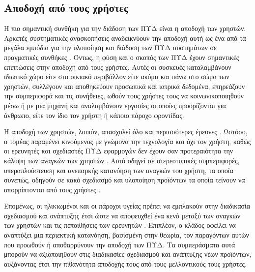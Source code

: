 \subsection{Αποδοχή από τους χρήστες}
Η πιο σημαντική συνθήκη για την διάδοση των ΠΥΔ είναι η αποδοχή των χρηστών.
Αρκετές συστηματικές ανασκοπήσεις αναδεικνύουν την αποδοχή αυτή ως ένα από τα μεγάλα εμπόδια για την υλοποίηση και διάδοση των ΠΥΔ συστημάτων σε πραγματικές συνθήκες \cite{Peek2014}\cite{rashidi2012survey}\cite{Robinson2014}.
Όντως, η φύση και ο σκοπός των ΠΥΔ έχουν σημαντικές επιπτώσεις στην αποδοχή από τους χρήστες.
Αυτές οι συσκευές καταλαμβάνουν ιδιωτικό χώρο είτε στο οικιακό περιβάλλον είτε ακόμα και πάνω στο σώμα των χρηστών, συλλέγουν και αποθηκεύουν προσωπικά και ιατρικά δεδομένα, επηρεάζουν την συμπεριφορά και τις συνήθειες, ωθούν τους χρήστες τους να κοινωνικοποιηθούν μέσω ή με μια μηχανή και αναλαμβάνουν εργασίες οι οποίες προορίζονται για άνθρωπο, είτε τον ίδιο τον χρήστη ή κάποιο πάροχο φροντίδας.
\par
Η αποδοχή των χρηστών, λοιπόν, απασχολεί όλο και περισσότερες έρευνες \cite{Liu2016}.
Ωστόσο, ο τομέας παραμένει κινούμενος με γνώμονα την τεχνολογία και όχι τον χρήστη, καθώς οι ερευνητές και σχεδιαστές ΠΥΔ εφαρμογών δεν έχουν σαν προτεραιότητα την κάλυψη των αναγκών των χρηστών \cite{Queiros2013}.
Αυτό οδηγεί σε στερεοτυπικές συμπεριφορές, υπεραπλούστευση και ανεπαρκής κατανόηση των αναγκών του χρήστη, τα οποία συνεπώς, οδηγούν σε κακό σχεδιασμό και υλοποίηση προϊόντων τα οποία τείνουν να απορρίπτονται από τους χρήστες \cite{Eisma2004}\cite{Ostlund2005}\cite{Peine2014}\cite{Vines2015}.
\par
Επομένως, οι ηλικιωμένοι και οι πάροχοι υγείας πρέπει να εμπλακούν στην διαδικασία σχεδιασμού και ανάπτυξης έτσι ώστε να αποφευχθεί ένα κενό μεταξύ των αναγκών των χρηστών και τις πεποιθήσεις των ερευνητών \cite{rashidi2012survey}\cite{Piau2013}\cite{Queiros2013}.
Επιπλέον, ο κλάδος οφείλει να αναπτύξει μια περιεκτική κατανόηση, βασισμένη στην θεωρία, τον παραγόντων αυτών που προωθούν ή αποθαρρύνουν την αποδοχή των ΠΥΔ.
Τα συμπεράσματα αυτά μπορούν να αξιοποιηθούν στις διαδικασίες σχεδιασμού και ανάπτυξης νέων προϊόντων, αυξάνοντας έτσι την πιθανότητα αποδοχής τους από τους μελλοντικούς τους χρήστες.
